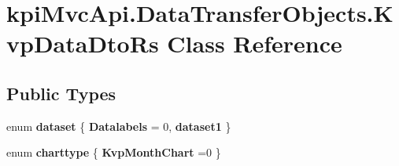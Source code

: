 \hypertarget{classkpi_mvc_api_1_1_data_transfer_objects_1_1_kvp_data_dto_rs}{}\section{kpi\+Mvc\+Api.\+Data\+Transfer\+Objects.\+Kvp\+Data\+Dto\+Rs Class Reference}
\label{classkpi_mvc_api_1_1_data_transfer_objects_1_1_kvp_data_dto_rs}
\subsection*{Public Types}
\begin{DoxyCompactItemize}
\item 
\mbox{\label{classkpi_mvc_api_1_1_data_transfer_objects_1_1_kvp_data_dto_rs_aec5ef29d115053aa1f78d15adc7e1373}} 
enum {\bfseries dataset} \{ {\bfseries Datalabels} = 0, 
{\bfseries dataset1}
 \}
\item 
\mbox{\label{classkpi_mvc_api_1_1_data_transfer_objects_1_1_kvp_data_dto_rs_a829c595d537885ae923de884be501246}} 
enum {\bfseries charttype} \{ {\bfseries Kvp\+Month\+Chart} =0
 \}
\end{DoxyCompactItemize}
